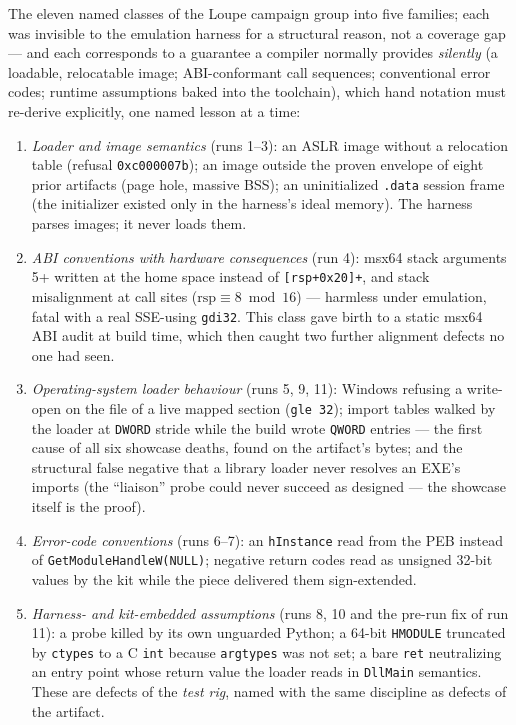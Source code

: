 \documentclass[11pt,a4paper]{article}
\newcommand{\code}[1]{\texttt{\small #1}}
\begin{document}
The eleven named classes of the Loupe campaign group into five families;
each was invisible to the emulation harness for a structural reason, not
a coverage gap --- and each corresponds to a guarantee a compiler
normally provides \emph{silently} (a loadable, relocatable image;
ABI-conformant call sequences; conventional error codes; runtime
assumptions baked into the toolchain), which hand notation must
re-derive explicitly, one named lesson at a time:

\begin{enumerate}
\item \emph{Loader and image semantics} (runs 1--3): an ASLR image
without a relocation table (refusal \code{0xc000\allowbreak 007b}); an image outside
the proven envelope of eight prior artifacts (page hole, massive BSS);
an uninitialized \code{.data} session frame (the initializer existed only
in the harness's ideal memory). The harness parses images; it never loads
them.
\item \emph{ABI conventions with hardware consequences} (run 4): msx64
stack arguments 5+ written at the home space instead of
\code{[rsp+0x20]+}, and stack misalignment at call sites
($\mathrm{rsp} \equiv 8 \bmod 16$) --- harmless under emulation, fatal
with a real SSE-using \code{gdi32}. This class gave birth to a static
msx64 ABI audit at build time, which then caught two further alignment
defects no one had seen.
\item \emph{Operating-system loader behaviour} (runs 5, 9, 11): Windows
refusing a write-open on the file of a live mapped section
(\code{gle 32}); import tables walked by the loader at \code{DWORD}
stride while the build wrote \code{QWORD} entries --- the first cause of
all six showcase deaths, found on the artifact's bytes; and the
structural false negative that a library loader never resolves an EXE's
imports (the ``liaison'' probe could never succeed as designed --- the
showcase itself is the proof).
\item \emph{Error-code conventions} (runs 6--7): an \code{hInstance}
read from the PEB instead of \code{GetModule\allowbreak HandleW\allowbreak (NULL)}; negative
return codes read as unsigned 32-bit values by the kit while the piece
delivered them sign-extended.
\item \emph{Harness- and kit-embedded assumptions} (runs 8, 10 and the
pre-run fix of run 11): a probe killed by its own unguarded Python; a
64-bit \code{HMODULE} truncated by \code{ctypes} to a C \code{int}
because \code{argtypes} was not set; a bare \code{ret} neutralizing an
entry point whose return value the loader reads in \code{DllMain}
semantics. These are defects of the \emph{test rig}, named with the same
discipline as defects of the artifact.
\end{enumerate}
\end{document}
